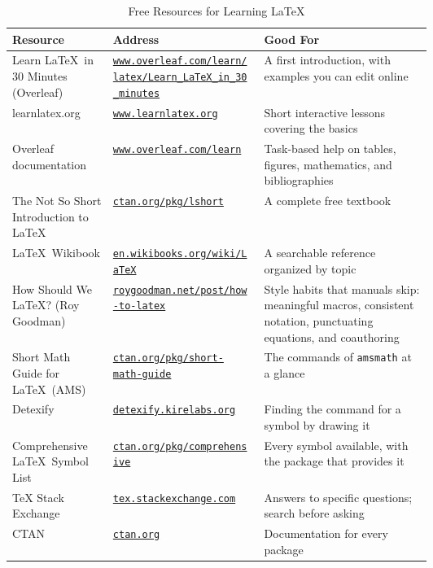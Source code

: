 \begin{table}
\centering
\caption{Free Resources for Learning \LaTeX}
\label{table:latexresources}
\begin{tabularx}{\linewidth}{|>{\raggedright\arraybackslash}p{0.24\linewidth}|>{\raggedright\arraybackslash}p{0.36\linewidth}|>{\raggedright\arraybackslash}X|}
\hline
\textbf{Resource} & \textbf{Address} & \textbf{Good For} \\
\hline
Learn \LaTeX\ in 30 Minutes (Overleaf) & \href{https://www.overleaf.com/learn/latex/Learn_LaTeX_in_30_minutes}{\nolinkurl{www.overleaf.com/learn/latex/Learn_LaTeX_in_30_minutes}} & A first introduction, with examples you can edit online \\
\hline
learnlatex.org & \href{https://www.learnlatex.org}{\nolinkurl{www.learnlatex.org}} & Short interactive lessons covering the basics \\
\hline
Overleaf documentation & \href{https://www.overleaf.com/learn}{\nolinkurl{www.overleaf.com/learn}} & Task-based help on tables, figures, mathematics, and bibliographies \\
\hline
The Not So Short Introduction to \LaTeX & \href{https://ctan.org/pkg/lshort}{\nolinkurl{ctan.org/pkg/lshort}} & A complete free textbook \\
\hline
\LaTeX\ Wikibook & \href{https://en.wikibooks.org/wiki/LaTeX}{\nolinkurl{en.wikibooks.org/wiki/LaTeX}} & A searchable reference organized by topic \\
\hline
How Should We \LaTeX? (Roy Goodman) & \href{https://roygoodman.net/post/how-to-latex/}{\nolinkurl{roygoodman.net/post/how-to-latex}} & Style habits that manuals skip: meaningful macros, consistent notation, punctuating equations, and coauthoring \\
\hline
Short Math Guide for \LaTeX\ (AMS) & \href{https://ctan.org/pkg/short-math-guide}{\nolinkurl{ctan.org/pkg/short-math-guide}} & The commands of \texttt{amsmath} at a glance \\
\hline
Detexify & \href{https://detexify.kirelabs.org}{\nolinkurl{detexify.kirelabs.org}} & Finding the command for a symbol by drawing it \\
\hline
Comprehensive \LaTeX\ Symbol List & \href{https://ctan.org/pkg/comprehensive}{\nolinkurl{ctan.org/pkg/comprehensive}} & Every symbol available, with the package that provides it \\
\hline
TeX Stack Exchange & \href{https://tex.stackexchange.com}{\nolinkurl{tex.stackexchange.com}} & Answers to specific questions; search before asking \\
\hline
CTAN & \href{https://ctan.org}{\nolinkurl{ctan.org}} & Documentation for every package \\
\hline
\end{tabularx}
\end{table}

